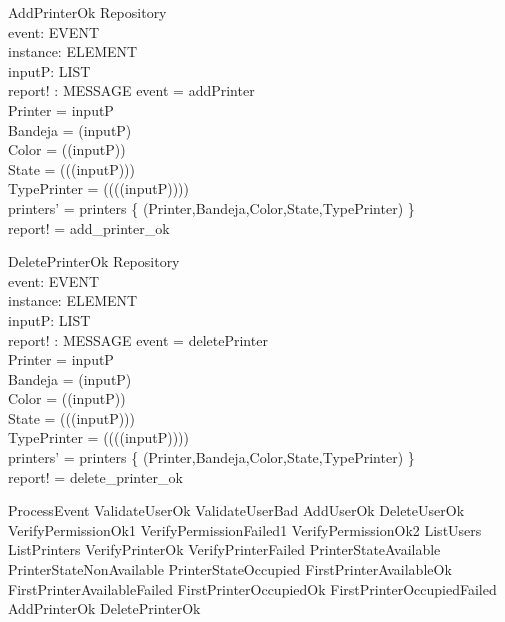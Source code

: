 \begin{schema}{AddPrinterOk}
\Delta Repository \\
event: EVENT \\
instance: ELEMENT \\
inputP: LIST \\
report! : MESSAGE
\where event = addPrinter \\
Printer = \head inputP \\
Bandeja = \head (\tail inputP) \\
Color = \head (\tail (\tail inputP)) \\
State = \head (\tail (\tail (\tail inputP))) \\
TypePrinter = \head (\tail (\tail (\tail (\tail inputP)))) \\
printers' = printers \uni \{ (Printer,Bandeja,Color,State,TypePrinter) \} \\
report! = add\_printer\_ok
\end{schema}

\begin{schema}{DeletePrinterOk}
\Delta Repository \\
event: EVENT \\
instance: ELEMENT \\
inputP: LIST \\
report! : MESSAGE
\where event = deletePrinter \\
Printer = \head inputP \\
Bandeja = \head (\tail inputP) \\
Color = \head (\tail (\tail inputP)) \\
State = \head (\tail (\tail (\tail inputP))) \\
TypePrinter = \head (\tail (\tail (\tail (\tail inputP)))) \\
printers' = printers \setminus \{ (Printer,Bandeja,Color,State,TypePrinter) \} \\
report! = delete\_printer\_ok
\end{schema}





\begin{zed}
ProcessEvent
             \sdef ValidateUserOk
             \lor ValidateUserBad
             \lor AddUserOk
             \lor DeleteUserOk
             \lor VerifyPermissionOk1
             \lor VerifyPermissionFailed1
             \lor VerifyPermissionOk2
             \lor ListUsers
             \lor ListPrinters
             \lor VerifyPrinterOk
             \lor VerifyPrinterFailed
             \lor PrinterStateAvailable
             \lor PrinterStateNonAvailable
             \lor PrinterStateOccupied
             \lor FirstPrinterAvailableOk
             \lor FirstPrinterAvailableFailed
             \lor FirstPrinterOccupiedOk
             \lor FirstPrinterOccupiedFailed
             \lor AddPrinterOk
             \lor DeletePrinterOk
\end{zed}